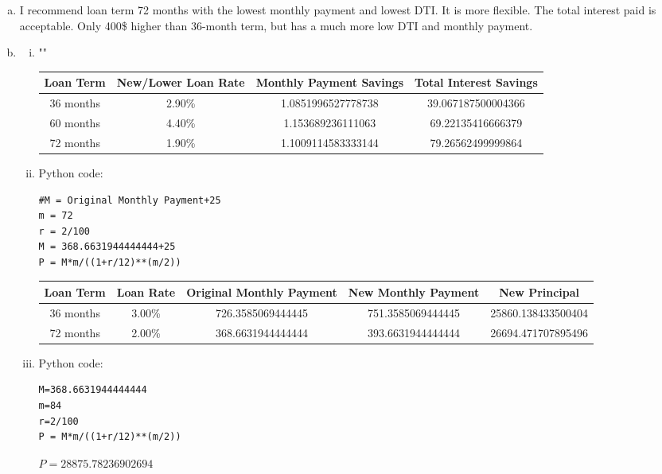 \documentclass{article}
\begin{document}
\begin{enumerate}[(a)]
   \item I recommend loan term 72 months with the lowest monthly payment and lowest DTI. It is more flexible. The total interest paid is acceptable. Only 400\$ higher than 36-month term, but has a much more low DTI and monthly payment. 
   
   \item 
   
      \begin{enumerate}[(i)]
       \item ""
       
\begin{table}[H]
    \centering
    \begin{tabular}{c|c|c|c}
        \hline
        Loan Term & New/Lower Loan Rate & Monthly Payment Savings & Total Interest Savings \\ \hline
        36 months &  2.90\%& 1.0851996527778738 & 39.067187500004366  \\ \hline
        60 months & 4.40\% &1.153689236111063 &  69.22135416666379 \\ \hline
        72 months & 1.90\%  & 1.1009114583333144 &  79.26562499999864 \\  \hline
    \end{tabular}
\end{table}
       
       \item Python code:
       \begin{verbatim}
#M = Original Monthly Payment+25
m = 72
r = 2/100
M = 368.6631944444444+25
P = M*m/((1+r/12)**(m/2))
\end{verbatim}

\begin{table}[H]
    \centering
    \begin{tabular}{c|c|c|c|c}
        \hline
        Loan Term & Loan Rate & Original Monthly Payment & New Monthly Payment & New Principal  \\ \hline
        36 months &  3.00\% &726.3585069444445 & 751.3585069444445  &  25860.138433500404\\ \hline
        72 months & 2.00\%  & 368.6631944444444 & 393.6631944444444 & 26694.471707895496 \\  \hline
    \end{tabular}
\end{table}
       
       \item Python code:
       \begin{verbatim}
M=368.6631944444444
m=84
r=2/100
P = M*m/((1+r/12)**(m/2))
\end{verbatim}
$P = 28875.78236902694$

       
   \end{enumerate}

   
 \end{enumerate}
\end{document}
